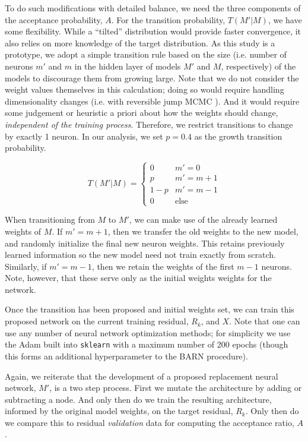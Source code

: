 \documentclass[12pt]{article}
\begin{document}
To do such modifications with detailed balance, we need the three components of the acceptance probability, $A$.  For the transition probability, $T(M'|M)$, we have some flexibility.  While a ``tilted'' distribution would provide faster convergence, it also relies on more knowledge of the target distribution.  As this study is a prototype, we adopt a simple transition rule based on the size (i.e. number of neurons $m'$ and $m$ in the hidden layer of models $M'$ and $M$, respectively) of the models to discourage them from growing large.  Note that we do not consider the weight values themselves in this calculation; doing so would require handling dimensionality changes (i.e. with reversible jump MCMC \cite{green1995reversible}).  And it would require some judgement or heuristic a priori about how the weights should change, \emph{independent of the training process}.  Therefore, we restrict transitions to change by exactly 1 neuron.  In our analysis, we set $p=0.4$ as the growth transition probability.

$$
T(M'|M) = \begin{cases}
			0 & m' = 0 \\
			p & m' = m + 1 \\
			1-p & m' = m - 1 \\
			0 & \text{else} 
\end{cases}
$$

When transitioning from $M$ to $M'$, we can make use of the already learned weights of $M$.  If $m' = m+1$, then we transfer the old weights to the new model, and randomly initialize the final new neuron weights.  This retains previously learned information so the new model need not train exactly from scratch.  Similarly, if $m' = m-1$, then we retain the weights of the first $m-1$ neurons.  Note, however, that these serve only as the initial weights weights for the network.

Once the transition has been proposed and initial weights set, we can train this proposed network on the current training residual, $R_k$, and $X$.  Note that one can use any number of neural network optimization methods; for simplicity we use the Adam built into \texttt{sklearn} \cite{kingma2014adam} with a maximum number of 200 epochs (though this forms an additional hyperparameter to the BARN procedure).

Again, we reiterate that the development of a proposed replacement neural network, $M'$, is a two step process.  First we mutate the architecture by adding or subtracting a node.  And only then do we train the resulting architecture, informed by the original model weights, on the target residual, $R_k$.  Only then do we compare this to residual \emph{validation} data for computing the acceptance ratio, $A$.
\end{document}
